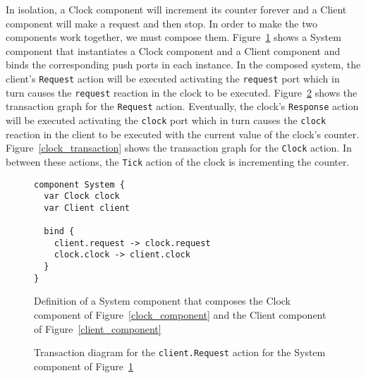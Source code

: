 In isolation, a Clock component will increment its counter forever and a Client component will make a request and then stop.
In order to make the two components work together, we must compose them.
Figure~\ref{system_component} shows a System component that instantiates a Clock component and a Client component and binds the corresponding push ports in each instance.
In the composed system, the client's \verb+Request+ action will be executed activating the \verb+request+ port which in turn causes the \verb+request+ reaction in the clock to be executed.
Figure~\ref{request_transaction} shows the transaction graph for the \verb+Request+ action.
Eventually, the clock's \verb+Response+ action will be executed activating the \verb+clock+ port which in turn causes the \verb+clock+ reaction in the client to be executed with the current value of the clock's counter.
Figure~\ref{clock_transaction} shows the transaction graph for the \verb+Clock+ action.
In between these actions, the \verb+Tick+ action of the clock is incrementing the counter.

\begin{figure}
\begin{verbatim}
component System {
  var Clock clock
  var Client client

  bind {
    client.request -> clock.request
    clock.clock -> client.clock
  }
}
\end{verbatim}
\caption{Definition of a System component that composes the Clock component of Figure~\ref{clock_component} and the Client component of Figure~\ref{client_component}}
\label{system_component}
\end{figure}

\begin{figure}
\centering
\begingroup
\fontsize{10pt}{12pt}\selectfont
{}
\endgroup
\cprotect\caption{Transaction diagram for the \verb+client.Request+ action for the System component of Figure~\ref{system_component}}
\label{request_transaction}
\end{figure}

